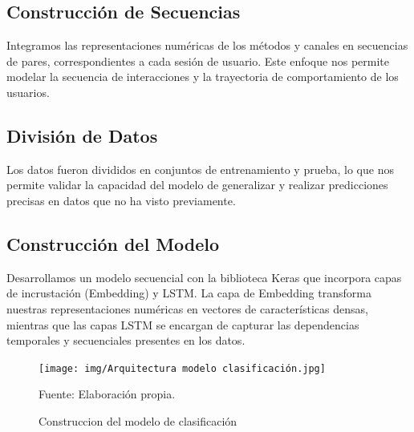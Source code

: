 \subsection{Construcción de Secuencias}

Integramos las representaciones numéricas de los métodos y canales en secuencias de pares, correspondientes a cada sesión de usuario. Este enfoque nos permite modelar la secuencia de interacciones y la trayectoria de comportamiento de los usuarios.

\subsection{División de Datos}

Los datos fueron divididos en conjuntos de entrenamiento y prueba, lo que nos permite validar la capacidad del modelo de generalizar y realizar predicciones precisas en datos que no ha visto previamente.

\subsection{Construcción del Modelo}

Desarrollamos un modelo secuencial con la biblioteca Keras que incorpora capas de incrustación (Embedding) y LSTM. La capa de Embedding transforma nuestras representaciones numéricas en vectores de características densas, mientras que las capas LSTM se encargan de capturar las dependencias temporales y secuenciales presentes en los datos.


\begin{figure}[H]
    \begin{minipage}[t]{0.9\textwidth}
        \caption{Construccion del modelo de clasificación}
        \label{parquitectura_clasificación}        
    \end{minipage}

    \vspace{10pt}

    \begin{minipage}[b]{1\textwidth}
        \centering
        \texttt{[image: img/Arquitectura modelo clasificación.jpg]}        
    \end{minipage}

    \begin{minipage}[t]{0.9\textwidth}
        Fuente: Elaboración propia.
    \end{minipage}
\end{figure}

